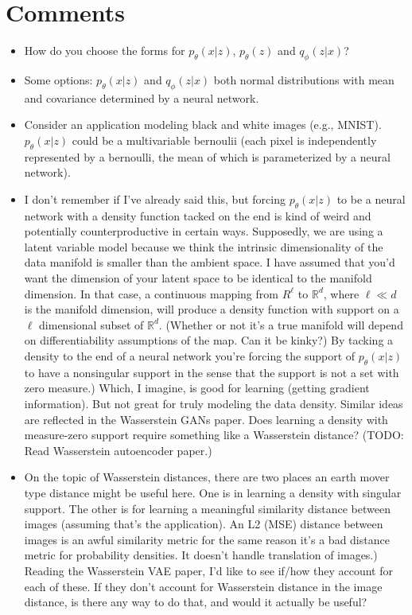 \documentclass{article}
\newcommand{\R}{\mathbb{R}}
\begin{document}
\section{Comments}
\begin{itemize}
    \item How do you choose the forms for $p_\theta(x|z)$, $p_\theta(z)$ and $q_\phi(z|x)$?
    \item Some options: $p_\theta(x|z)$ and $q_\phi(z|x)$ both normal distributions with mean and covariance determined by a neural network. 
    \item Consider an application modeling black and white images (e.g., MNIST). $p_\theta(x|z)$ could be a multivariable bernoulii (each pixel is independently represented by a bernoulli, the mean of which is parameterized by a neural network). 
    \item I don't remember if I've already said this, but forcing $p_\theta(x|z)$ to be a neural network with a density function tacked on the end is kind of weird and potentially counterproductive in certain ways. Supposedly, we are using a latent variable model because we think the intrinsic dimensionality of the data manifold is smaller than the ambient space. I have assumed that you'd want the dimension of your latent space to be identical to the manifold dimension. In that case, a continuous mapping from $R^\ell$ to $\R^d$, where $\ell \ll d$ is the manifold dimension, will produce a density function with support on a $\ell$ dimensional subset of $\R^d$. (Whether or not it's a true manifold will depend on differentiability assumptions of the map. Can it be kinky?) By tacking a density to the end of a neural network you're forcing the support of $p_\theta(x|z)$ to have a nonsingular support in the sense that the support is not a set with zero measure.) Which, I imagine, is good for learning (getting gradient information). But not great for truly modeling the data density. Similar ideas are reflected in the Wasserstein GANs paper. Does learning a density with measure-zero support require something like a Wasserstein distance? (TODO: Read Wasserstein autoencoder paper.) 
    \item On the topic of Wasserstein distances, there are two places an earth mover type distance might be useful here. One is in learning a density with singular support. The other is for learning a meaningful similarity distance between images (assuming that's the application). An L2 (MSE) distance between images is an awful similarity metric for the same reason it's a bad distance metric for probability densities. It doesn't handle translation of images.) Reading the Wasserstein VAE paper, I'd like to see if/how they account for each of these. If they don't account for Wasserstein distance in the image distance, is there any way to do that, and would it actually be useful?
\end{itemize}
\end{document}
